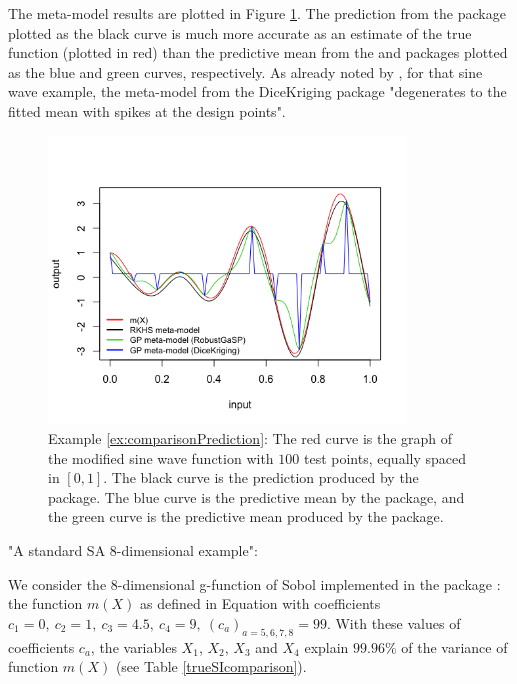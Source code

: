 The meta-model results are plotted in Figure \ref{Rplotex6}. The prediction from the  package plotted as the black curve is much more accurate as an estimate of the true function (plotted in red) than the predictive mean from the  and  packages plotted as the blue and green curves, respectively. As already noted by \citet{Gu_2019}, for that sine wave
example, the meta-model from the DiceKriging package "degenerates to the
fitted mean with spikes at the design points".
\begin{figure}[h!]
  \centering
  \includegraphics[width=9.5cm]{Rplotex6.png}
  \caption{Example \ref{ex:comparisonPrediction}: The red curve is the graph of the modified sine wave function with $100$ test points, equally spaced in $[0,1]$. The black curve is the prediction produced by the
 package. The blue curve is the predictive mean by the  package, and the green curve is the predictive mean produced by the  package.}
  \label{Rplotex6}
\end{figure}

\begin{exemp}\label{ex:comparison} "A standard SA 8-dimensional example":
\end{exemp}
We consider the $8$-dimensional g-function of Sobol implemented in the package : the function $m(X)$ as defined in Equation  with coefficients $c_1=0,\:c_2=1,\:c_3=4.5,\:c_4=9,\:(c_a)_{a=5,6,7,8}=99$. With these values of coefficients $c_a$, the variables $X_1$, $X_2$, $X_3$ and $X_4$ explain $99.96\%$ of the variance of function $m(X)$ (see Table \ref{trueSIcomparison}).
  
